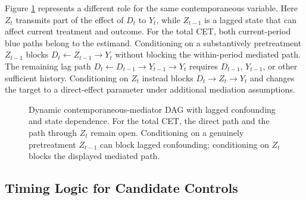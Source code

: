 \documentclass[
]{article}
\begin{document}
Figure \ref{fig:dynamic_mediator_pa} represents a different role for the
same contemporaneous variable. Here \(Z_t\) transmits part of the effect
of \(D_t\) to \(Y_t\), while \(Z_{t-1}\) is a lagged state that can
affect current treatment and outcome. For the total CET, both
current-period blue paths belong to the estimand. Conditioning on a
substantively pretreatment \(Z_{t-1}\) blocks
\(D_t\leftarrow Z_{t-1}\rightarrow Y_t\) without blocking the
within-period mediated path. The remaining lag path
\(D_t\leftarrow D_{t-1}\rightarrow Y_{t-1}\rightarrow Y_t\) requires
\(D_{t-1}\), \(Y_{t-1}\), or other sufficient history. Conditioning on
\(Z_t\) instead blocks \(D_t\rightarrow Z_t\rightarrow Y_t\) and changes
the target to a direct-effect parameter under additional mediation
assumptions.

\begin{figure}[H]
\centering
{}
\caption{Dynamic contemporaneous-mediator DAG with lagged confounding and state dependence. For the total CET, the direct path and the path through $Z_t$ remain open. Conditioning on a genuinely pretreatment $Z_{t-1}$ can block lagged confounding; conditioning on $Z_t$ blocks the displayed mediated path.}
\label{fig:dynamic_mediator_pa}
\end{figure}

\subsection{Timing Logic for Candidate
Controls}\label{timing-logic-for-candidate-controls}
\end{document}
